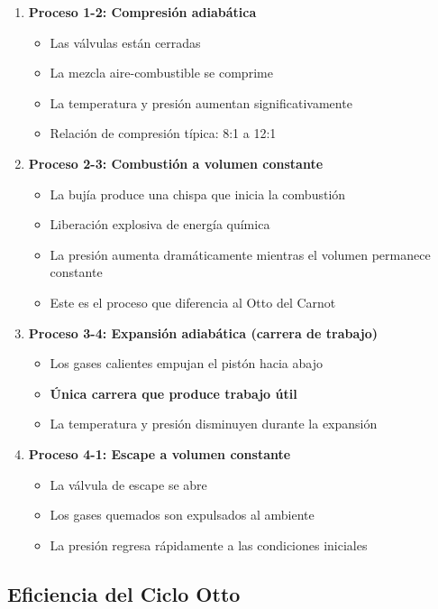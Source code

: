 \documentclass{article}
\begin{document}
\begin{enumerate}
    \item \textbf{Proceso 1-2: Compresión adiabática}
    \begin{itemize}
        \item Las válvulas están cerradas
        \item La mezcla aire-combustible se comprime
        \item La temperatura y presión aumentan significativamente
        \item Relación de compresión típica: 8:1 a 12:1
    \end{itemize}
    
    \item \textbf{Proceso 2-3: Combustión a volumen constante}
    \begin{itemize}
        \item La bujía produce una chispa que inicia la combustión
        \item Liberación explosiva de energía química
        \item La presión aumenta dramáticamente mientras el volumen permanece constante
        \item Este es el proceso que diferencia al Otto del Carnot
    \end{itemize}
    
    \item \textbf{Proceso 3-4: Expansión adiabática (carrera de trabajo)}
    \begin{itemize}
        \item Los gases calientes empujan el pistón hacia abajo
        \item \textbf{Única carrera que produce trabajo útil}
        \item La temperatura y presión disminuyen durante la expansión
    \end{itemize}
    
    \item \textbf{Proceso 4-1: Escape a volumen constante}
    \begin{itemize}
        \item La válvula de escape se abre
        \item Los gases quemados son expulsados al ambiente
        \item La presión regresa rápidamente a las condiciones iniciales
    \end{itemize}
\end{enumerate}

\subsection*{Eficiencia del Ciclo Otto}
\end{document}
